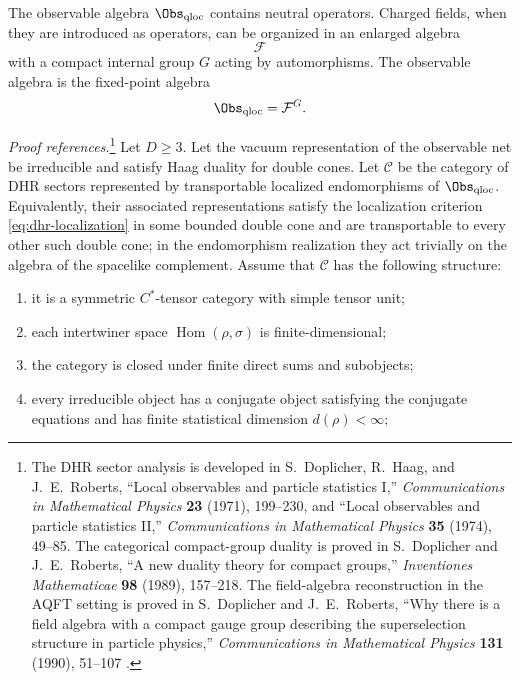 The observable algebra \(\Obs_{\rm qloc}\) contains neutral operators.  Charged fields,
when they are introduced as operators, can be organized in an enlarged algebra
\[
  \mathcal F
\]
with a compact internal group \(G\) acting by automorphisms.  The observable
algebra is the fixed-point algebra
\[
  \Obs_{\rm qloc}=\mathcal F^G .
\]

\begin{quotedtheorem}
\label{thm:doplicher-roberts-reconstruction}
\emph{Proof references.}\footnote{The DHR sector analysis is developed in
S.~Doplicher, R.~Haag, and J.~E.~Roberts, ``Local observables and particle
statistics I,'' \emph{Communications in Mathematical Physics} \textbf{23}
(1971), 199--230, and ``Local observables and particle statistics II,''
\emph{Communications in Mathematical Physics} \textbf{35} (1974), 49--85.
The categorical compact-group duality is proved in S.~Doplicher and
J.~E.~Roberts, ``A new duality theory for compact groups,''
\emph{Inventiones Mathematicae} \textbf{98} (1989), 157--218.  The
field-algebra reconstruction in the AQFT setting is proved in S.~Doplicher
and J.~E.~Roberts, ``Why there is a field algebra with a compact gauge group
describing the superselection structure in particle physics,''
\emph{Communications in Mathematical Physics} \textbf{131} (1990), 51--107
\cite{DHR1971,DHR1974,DR1989,DR1990}.}
Let \(D\ge3\).  Let the vacuum representation of the observable net be
irreducible and satisfy Haag duality for double cones.  Let \(\mathcal C\) be
the category of DHR sectors represented by transportable localized
endomorphisms of \(\Obs_{\rm qloc}\).  Equivalently, their associated
representations satisfy the localization criterion
\eqref{eq:dhr-localization} in some bounded double cone and are transportable
to every other such double cone; in the endomorphism realization they act
trivially on the algebra of the spacelike complement.  Assume that
\(\mathcal C\) has the following structure:
\begin{enumerate}[label=\textup{(\roman*)}]
\item it is a symmetric \(C^*\)-tensor category with simple tensor unit;
\item each intertwiner space \(\operatorname{Hom}(\rho,\sigma)\) is
finite-dimensional;
\item the category is closed under finite direct sums and subobjects;
\item every irreducible object has a conjugate object satisfying the conjugate
equations and has finite statistical dimension \(d(\rho)<\infty\);

\end{enumerate}
\end{quotedtheorem}
